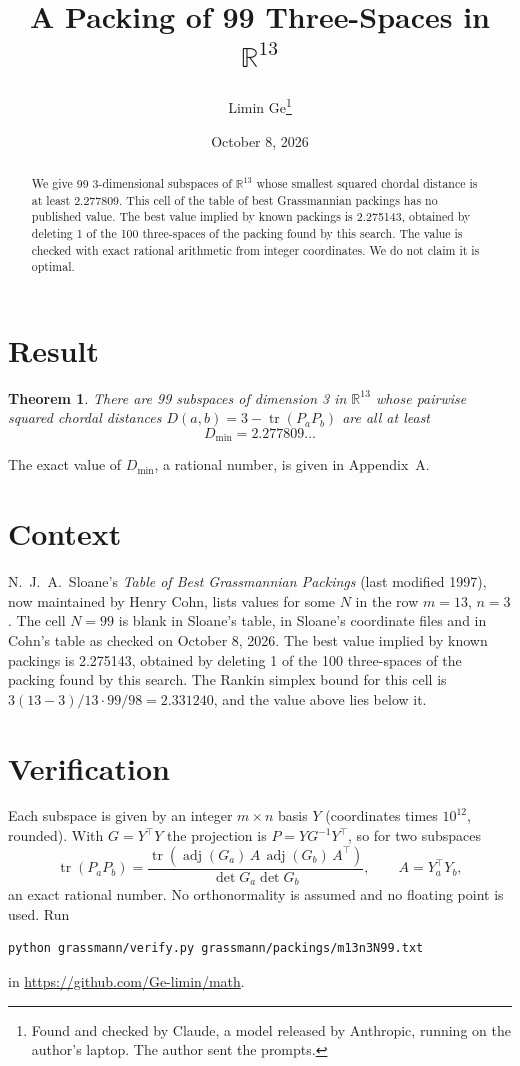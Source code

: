 \documentclass[11pt,a4paper]{article}
\title{A Packing of 99 Three-Spaces in $\mathbb{R}^{13}$}
\author{Limin Ge\thanks{Found and checked by Claude, a model released by Anthropic, running on the author's laptop. The author sent the prompts.}}
\date{October 8, 2026}
\newtheorem*{theorem}{Theorem}
\begin{document}
\maketitle
\begin{abstract}
We give 99 3-dimensional subspaces of $\mathbb{R}^{13}$ whose smallest squared chordal distance is at least 2.277809. This cell of the table of best Grassmannian packings has no published value. The best value implied by known packings is 2.275143, obtained by deleting 1 of the 100 three-spaces of the packing found by this search. The value is checked with exact rational arithmetic from integer coordinates. We do not claim it is optimal.
\end{abstract}

\section{Result}
\begin{theorem}
There are 99 subspaces of dimension 3 in $\mathbb{R}^{13}$ whose pairwise squared chordal distances $D(a,b) = 3 - \operatorname{tr}(P_aP_b)$ are all at least
\[ D_{\min} = 2.277809\ldots \]
\end{theorem}
The exact value of $D_{\min}$, a rational number, is given in Appendix~A.


\section{Context}
N.~J.~A.~Sloane's \emph{Table of Best Grassmannian Packings} (last modified 1997), now maintained by Henry Cohn, lists values for some $N$ in the row $m=13$, $n=3$. The cell $N=99$ is blank in Sloane's table, in Sloane's coordinate files and in Cohn's table as checked on October 8, 2026. The best value implied by known packings is 2.275143, obtained by deleting 1 of the 100 three-spaces of the packing found by this search. The Rankin simplex bound for this cell is $3(13-3)/13\cdot 99/98 = 2.331240$, and the value above lies below it.


\section{Verification}
Each subspace is given by an integer $m\times n$ basis $Y$ (coordinates times $10^{12}$, rounded). With $G=Y^\top Y$ the projection is $P=YG^{-1}Y^\top$, so for two subspaces
\[ \operatorname{tr}(P_aP_b)=\frac{\operatorname{tr}(\operatorname{adj}(G_a)\,A\,\operatorname{adj}(G_b)\,A^\top)}{\det G_a\det G_b},\qquad A=Y_a^\top Y_b, \]
an exact rational number. No orthonormality is assumed and no floating point is used. Run
\begin{verbatim}
python grassmann/verify.py grassmann/packings/m13n3N99.txt
\end{verbatim}
in \url{https://github.com/Ge-limin/math}.
\end{document}
